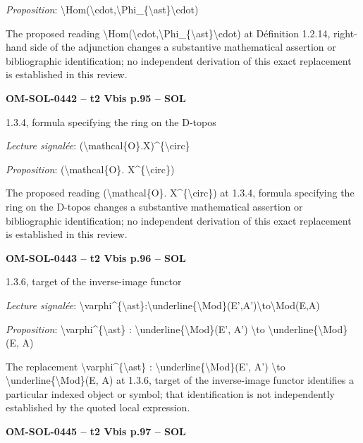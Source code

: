 \emph{Proposition}: \textbackslash{}Hom(\textbackslash{}cdot,\textbackslash{}Phi\_\{\textbackslash{}ast\}\textbackslash{}cdot)\par
The proposed reading \textbackslash{}Hom(\textbackslash{}cdot,\textbackslash{}Phi\_\{\textbackslash{}ast\}\textbackslash{}cdot) at Définition 1.2.14, right-hand side of the adjunction changes a substantive mathematical assertion or bibliographic identification; no independent derivation of this exact replacement is established in this review.\par
\par\noindent\textbf{OM-SOL-0442 -- t2 Vbis p.95 -- SOL}\par
1.3.4, formula specifying the ring on the D-topos\par
\emph{Lecture signalée}: (\textbackslash{}mathcal\{O\}.X)\textasciicircum{}\{\textbackslash{}circ\}\par
\emph{Proposition}: (\textbackslash{}mathcal\{O\}. X\textasciicircum{}\{\textbackslash{}circ\})\par
The proposed reading (\textbackslash{}mathcal\{O\}. X\textasciicircum{}\{\textbackslash{}circ\}) at 1.3.4, formula specifying the ring on the D-topos changes a substantive mathematical assertion or bibliographic identification; no independent derivation of this exact replacement is established in this review.\par
\par\noindent\textbf{OM-SOL-0443 -- t2 Vbis p.96 -- SOL}\par
1.3.6, target of the inverse-image functor\par
\emph{Lecture signalée}: \textbackslash{}varphi\textasciicircum{}\{\textbackslash{}ast\}:\textbackslash{}underline\{\textbackslash{}Mod\}(E',A')\textbackslash{}to\textbackslash{}Mod(E,A)\par
\emph{Proposition}: \textbackslash{}varphi\textasciicircum{}\{\textbackslash{}ast\} : \textbackslash{}underline\{\textbackslash{}Mod\}(E', A') \textbackslash{}to \textbackslash{}underline\{\textbackslash{}Mod\}(E, A)\par
The replacement \textbackslash{}varphi\textasciicircum{}\{\textbackslash{}ast\} : \textbackslash{}underline\{\textbackslash{}Mod\}(E', A') \textbackslash{}to \textbackslash{}underline\{\textbackslash{}Mod\}(E, A) at 1.3.6, target of the inverse-image functor identifies a particular indexed object or symbol; that identification is not independently established by the quoted local expression.\par
\par\noindent\textbf{OM-SOL-0445 -- t2 Vbis p.97 -- SOL}\par
